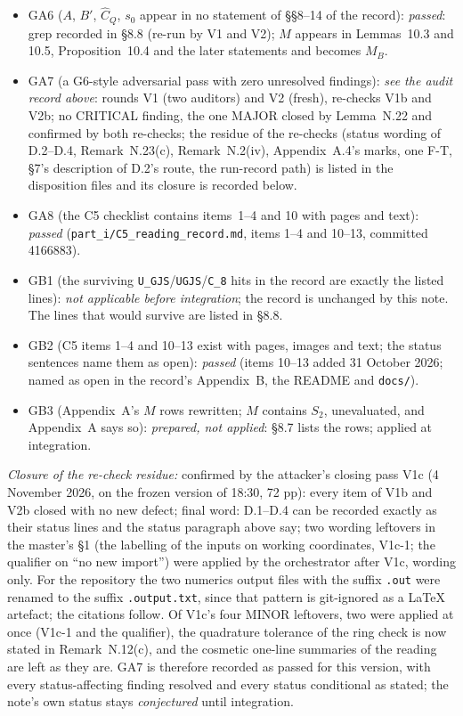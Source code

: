 \begin{itemize}
  \texttt{UGJS} and no $C_8$ (grep recorded in \S8.8, re-run by V1 and V2); the record itself
  still carries 21 hits in \S\S4--7, all inside the texts to be replaced at integration.
\item GA6 ($A$, $B'$, $\widehat C_Q$, $s_0$ appear in no statement of \S\S8--14 of the record):
  \emph{passed}: grep recorded in \S8.8 (re-run by V1 and V2); $M$ appears in Lemmas~10.3 and
  10.5, Proposition~10.4 and the later statements and becomes $M_B$.
\item GA7 (a G6-style adversarial pass with zero unresolved findings): \emph{see the audit
  record above}: rounds V1 (two auditors) and V2 (fresh), re-checks V1b and V2b; no CRITICAL
  finding, the one MAJOR closed by Lemma~N.22 and confirmed by both re-checks; the residue of
  the re-checks (status wording of D.2--D.4, Remark~N.23(c), Remark~N.2(iv), Appendix~A.4's
  marks, one F-T, \S7's description of D.2's route, the run-record path) is listed in the
  disposition files and its closure is recorded below.
\item GA8 (the C5 checklist contains items~1--4 and 10 with pages and text): \emph{passed}
  (\texttt{part\_i/C5\_reading\_record.md}, items 1--4 and 10--13, committed 4166883).
\item GB1 (the surviving \texttt{U\_GJS}/\texttt{UGJS}/\texttt{C\_8} hits in the record are
  exactly the listed lines): \emph{not applicable before integration}; the record is unchanged
  by this note. The lines that would survive are listed in \S8.8.
\item GB2 (C5 items 1--4 and 10--13 exist with pages, images and text; the status sentences
  name them as open): \emph{passed} (items 10--13 added 31 October 2026; named as open in the
  record's Appendix~B, the README and \texttt{docs/}).
\item GB3 (Appendix~A's $M$ rows rewritten; $M$ contains $S_2$, unevaluated, and Appendix~A
  says so): \emph{prepared, not applied}: \S8.7 lists the rows; applied at integration.
\end{itemize}
\emph{Closure of the re-check residue:} confirmed by the attacker's closing pass V1c (4 November
2026, on the frozen version of 18:30, 72 pp): every item of V1b and V2b closed with no new
defect; final word: D.1--D.4 can be recorded exactly as their status lines and the status
paragraph above say; two wording leftovers in the master's \S1 (the labelling of the inputs
on working coordinates, V1c-1; the qualifier on ``no new import'') were applied by the
orchestrator after V1c, wording only. For the repository the two numerics output files
with the suffix \texttt{.out} were renamed to the suffix \texttt{.output.txt}, since that pattern is
git-ignored as a LaTeX artefact; the citations follow.
Of V1c's four MINOR leftovers, two were applied at once (V1c-1 and the qualifier), the
quadrature tolerance of the ring check is now stated in Remark~N.12(c), and the cosmetic
one-line summaries of the reading are left as they are. GA7 is therefore recorded as passed
for this version, with every status-affecting finding resolved and every status conditional
as stated; the note's own status stays \emph{conjectured} until integration.
